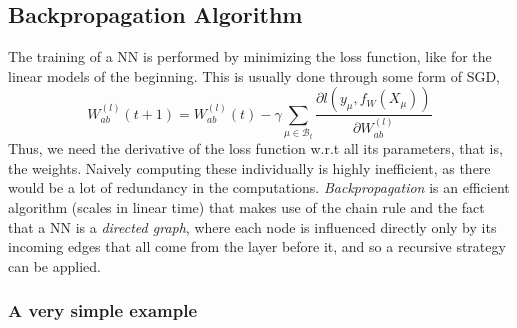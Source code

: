 \documentclass{article}
\begin{document}
\subsection{Backpropagation Algorithm}
The training of a NN is performed by minimizing the loss function, like for the linear models of the beginning. This is usually done through some form of SGD,
\begin{equation}
    W^{(l)}_{a b} (t+1)
    =
    W^{(l)}_{a b} (t)
    - \gamma
    \sum_{\mu \in \mathcal{B}_t}
    \frac{\partial l(y_{\mu}, f_W(X_{\mu}))}{\partial W^{(l)}_{a b}}
\end{equation}
Thus, we need the derivative of the loss function w.r.t all its parameters, that is, the weights. Naively computing these individually is highly inefficient, as there would be a lot of redundancy in the computations. \emph{Backpropagation} is an efficient algorithm (scales in linear time) that makes use of the chain rule and the fact that a NN is a \emph{directed graph}, where each node is influenced directly only by its incoming edges that all come from the layer before it, and so a recursive strategy can be applied.


\subsubsection*{A very simple example}
\end{document}
